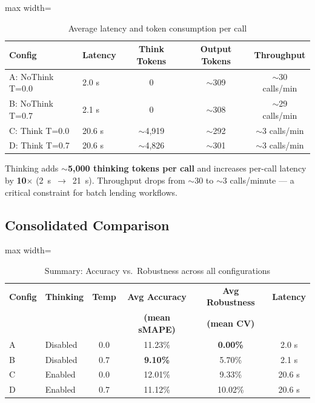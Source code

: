 \documentclass[11pt,a4paper]{article}
\begin{document}
\begin{table}[H]\centering
\caption{Average latency and token consumption per call}
\label{tab:think_latency}
\begin{adjustbox}{max width=\textwidth}
\begin{tabular}{llccc}\toprule
\textbf{Config} & \textbf{Latency} & \textbf{Think Tokens} &
\textbf{Output Tokens} & \textbf{Throughput}\\\midrule
A: NoThink T=0.0 & 2.0 s & 0    & $\sim$309 & $\sim$30 calls/min\\
B: NoThink T=0.7 & 2.1 s & 0    & $\sim$308 & $\sim$29 calls/min\\
C: Think   T=0.0 & 20.6 s & $\sim$4{,}919 & $\sim$292 & $\sim$3 calls/min\\
D: Think   T=0.7 & 20.6 s & $\sim$4{,}826 & $\sim$301 & $\sim$3 calls/min\\
\bottomrule
\end{tabular}
\end{adjustbox}
\end{table}

Thinking adds \textbf{$\sim$5{,}000 thinking tokens per call} and increases
per-call latency by \textbf{10$\times$} (2~s~$\to$~21~s).  Throughput drops
from $\sim$30 to $\sim$3 calls/minute --- a critical constraint for batch
lending workflows.

\subsection{Consolidated Comparison}

\begin{table}[H]\centering
\caption{Summary: Accuracy vs.\ Robustness across all configurations}
\label{tab:think_summary}
\begin{adjustbox}{max width=\textwidth}
\begin{tabular}{llcccc}\toprule
\textbf{Config} & \textbf{Thinking} & \textbf{Temp} &
\textbf{Avg Accuracy} & \textbf{Avg Robustness} & \textbf{Latency}\\
& & & \textbf{(mean sMAPE)} & \textbf{(mean CV)} & \\\midrule
\rowcolor{bestgreen}
A & Disabled & 0.0 & 11.23\% & \textbf{0.00\%} & 2.0 s\\
\rowcolor{midyellow}
B & Disabled & 0.7 & \textbf{9.10\%} & 5.70\% & 2.1 s\\
\rowcolor{badred}
C & Enabled  & 0.0 & 12.01\% & 9.33\% & 20.6 s\\
\rowcolor{badred}
D & Enabled  & 0.7 & 11.12\% & 10.02\% & 20.6 s\\
\bottomrule
\end{tabular}
\end{adjustbox}
\end{table}
\end{document}

